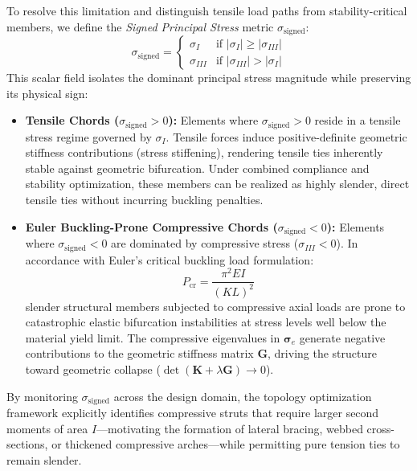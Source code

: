 \documentclass[11pt, a4paper]{article}
\begin{document}
To resolve this limitation and distinguish tensile load paths from stability-critical members, we define the \textit{Signed Principal Stress} metric $\sigma_{\text{signed}}$:
\begin{equation}
\sigma_{\text{signed}} = \begin{cases}
\sigma_I & \text{if } |\sigma_I| \ge |\sigma_{III}| \\[6pt]
\sigma_{III} & \text{if } |\sigma_{III}| > |\sigma_I|
\end{cases}
\end{equation}
This scalar field isolates the dominant principal stress magnitude while preserving its physical sign:
\begin{itemize}
    \item \textbf{Tensile Chords ($\sigma_{\text{signed}} > 0$):} Elements where $\sigma_{\text{signed}} > 0$ reside in a tensile stress regime governed by $\sigma_I$. Tensile forces induce positive-definite geometric stiffness contributions (stress stiffening), rendering tensile ties inherently stable against geometric bifurcation. Under combined compliance and stability optimization, these members can be realized as highly slender, direct tensile ties without incurring buckling penalties.
    \item \textbf{Euler Buckling-Prone Compressive Chords ($\sigma_{\text{signed}} < 0$):} Elements where $\sigma_{\text{signed}} < 0$ are dominated by compressive stress ($\sigma_{III} < 0$). In accordance with Euler's critical buckling load formulation:
    \begin{equation}
    P_{\text{cr}} = \frac{\pi^2 E I}{(K L)^2}
    \end{equation}
    slender structural members subjected to compressive axial loads are prone to catastrophic elastic bifurcation instabilities at stress levels well below the material yield limit. The compressive eigenvalues in $\boldsymbol{\sigma}_e$ generate negative contributions to the geometric stiffness matrix $\mathbf{G}$, driving the structure toward geometric collapse ($\det(\mathbf{K} + \lambda \mathbf{G}) \to 0$).
\end{itemize}
By monitoring $\sigma_{\text{signed}}$ across the design domain, the topology optimization framework explicitly identifies compressive struts that require larger second moments of area $I$—motivating the formation of lateral bracing, webbed cross-sections, or thickened compressive arches—while permitting pure tension ties to remain slender.
\end{document}
